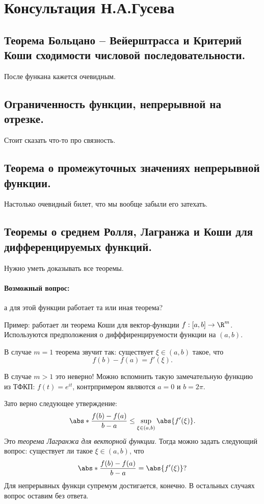 \section{Консультация Н.А.Гусева}

\subsection{Теорема Больцано -- Вейерштрасса и Критерий Коши сходимости числовой последовательности.}

После функана кажется очевидным.

\subsection{Ограниченность функции, непрерывной на отрезке.}

Стоит сказать что-то про связность. 

\subsection{Теорема о промежуточных значениях непрерывной функции.}
Настолько очевидный билет, что мы вообще забыли его затехать.

\subsection{Теоремы о среднем Ролля, Лагранжа и Коши для дифференцируемых функций.}

Нужно уметь доказывать все теоремы.

\paragraph*{Возможный вопрос:} а для этой функции работает та или иная теорема?

Пример: работает ли теорема Коши для вектор-функции $f: [a, b] \to \R^m$. Используются предположения о дифффиренцируемости функции на $(a, b)$.

В случае $m = 1$ теорема звучит так: существует $\xi \in (a, b)$ такое, что
\begin{equation*}
    f(b) - f(a) = f'(\xi).
\end{equation*}

В случае $m > 1$ это неверно! Можно вспомнить такую замечательную функцию из ТФКП: $f(t) = e^{it}$, контрпримером являются $a = 0$ и $b = 2\pi$.

Зато верно следующее утверждение:
\begin{equation*}
    \abs*{\frac{f(b) - f(a)}{b - a}} \leq \sup_{\xi \in (a, b)} \abs{f'(\xi)}.
\end{equation*}
Это \textit{теорема Лагранжа для векторной функции}. Тогда можно задать следующий вопрос: существует ли такое $\xi \in (a, b)$, что
\begin{equation*}
    \abs*{\frac{f(b) - f(a)}{b - a}} = \abs{f'(\xi)}?
\end{equation*}
Для непрерывных функци супремум достигается, конечно. В остальных случаях вопрос оставим без ответа.

